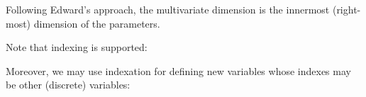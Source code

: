\documentclass[letterpaper,10pt,english]{sphinxmanual}
\begin{document}
Following Edward’s approach, the multivariate dimension is the innermost (right-most)
dimension of the parameters.

Note that indexing is supported:

\begin{sphinxVerbatim}[commandchars=\\\{\}]
  \PYG{p}{[}\PYG{p}{]}                                              

  \PYG{p}{[}\PYG{p}{]}                                               

  \PYG{p}{[}\PYG{p}{]}                                             

  \PYG{p}{[}\PYG{p}{]}                                             
\end{sphinxVerbatim}

Moreover, we may use indexation for defining new variables whose indexes may be other (discrete) variables:

\begin{sphinxVerbatim}[commandchars=\\\{\}]
    
  \PYG{p}{[}\PYG{p}{]}             
\end{sphinxVerbatim}
\end{document}
